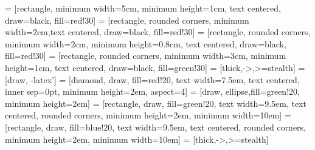 \usetikzlibrary{shapes, arrows}
\usetikzlibrary{decorations.pathreplacing}
\usetikzlibrary{positioning, calc}
 = [rectangle, minimum width=5cm, minimum height=1cm, text centered, draw=black, fill=red!30]
 = [rectangle, rounded corners, minimum width=2cm,text centered, draw=black, fill=red!30]
 = [rectangle, rounded corners, minimum width=2cm, minimum height=0.8cm, text centered, draw=black, fill=red!30]
 = [rectangle, rounded corners, minimum width=3cm, minimum height=1cm, text centered, draw=black, fill=green!30]
 = [thick,->,>=stealth]
 =[draw, -latex']
 = [diamond, draw, fill=red!20, text width=7.5em, text centered,  inner sep=0pt, minimum height=2em, aspect=4]
 = [draw, ellipse,fill=green!20, minimum height=2em]
 = [rectangle, draw, fill=green!20, text width=9.5em, text centered, rounded corners, minimum height=2em, minimum width=10em]
=[rectangle, draw, fill=blue!20, text width=9.5em,
                   text centered, rounded corners, minimum height=2em,
                   minimum width=10em]
 = [thick,->,>=stealth]



